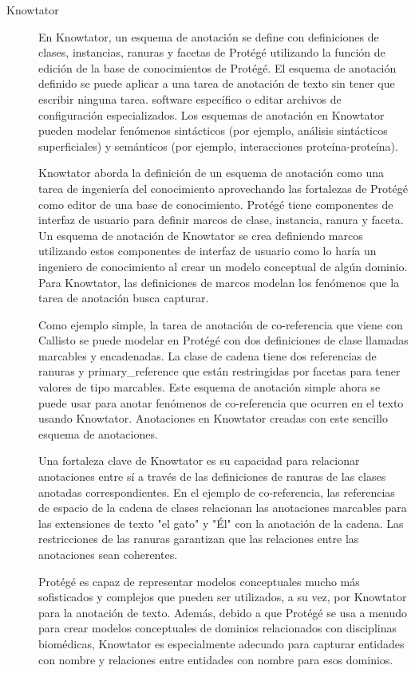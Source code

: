 \begin{description}
\item[Knowtator]

En Knowtator, un esquema de anotación se define con definiciones de clases, instancias, ranuras y facetas de Protégé utilizando la función de edición de la base de conocimientos de Protégé. El esquema de anotación definido se puede aplicar a una tarea de anotación de texto sin tener que escribir ninguna tarea.
software específico o editar archivos de configuración especializados. Los esquemas de anotación en Knowtator pueden modelar fenómenos sintácticos (por ejemplo, análisis sintácticos superficiales) y semánticos (por ejemplo, interacciones proteína-proteína).

Knowtator aborda la definición de un esquema de anotación como una tarea de ingeniería del conocimiento aprovechando las fortalezas de Protégé como editor de una base de conocimiento. Protégé tiene componentes de interfaz de usuario para definir marcos de clase, instancia, ranura y faceta.
Un esquema de anotación de Knowtator se crea definiendo marcos utilizando estos componentes de interfaz de usuario como lo haría un ingeniero de conocimiento al crear un modelo conceptual de algún dominio. Para Knowtator, las definiciones de marcos modelan los fenómenos que la tarea de anotación busca capturar.

Como ejemplo simple, la tarea de anotación de co-referencia que viene con Callisto se puede modelar en Protégé con dos definiciones de clase llamadas marcables y encadenadas. La clase de cadena tiene dos referencias de ranuras y primary\_reference que están restringidas por facetas para tener valores de tipo marcables. Este esquema de anotación simple ahora se puede usar para anotar fenómenos de co-referencia que ocurren en el texto usando Knowtator. Anotaciones en Knowtator creadas con este sencillo esquema de anotaciones.

Una fortaleza clave de Knowtator es su capacidad para relacionar anotaciones entre sí a través de las definiciones de ranuras de las clases anotadas correspondientes. En el ejemplo de co-referencia, las referencias de espacio de la cadena de clases relacionan las anotaciones marcables para las extensiones de texto "el gato" y "Él" con la anotación de la cadena. Las restricciones de las ranuras garantizan que las relaciones entre las anotaciones sean coherentes.

Protégé es capaz de representar modelos conceptuales mucho más sofisticados y complejos que pueden ser utilizados, a su vez, por Knowtator para la anotación de texto. Además, debido a que Protégé se usa a menudo para crear modelos conceptuales de dominios relacionados con disciplinas biomédicas, Knowtator es especialmente adecuado para capturar entidades con nombre y relaciones entre entidades con nombre para esos dominios.


\end{description}
